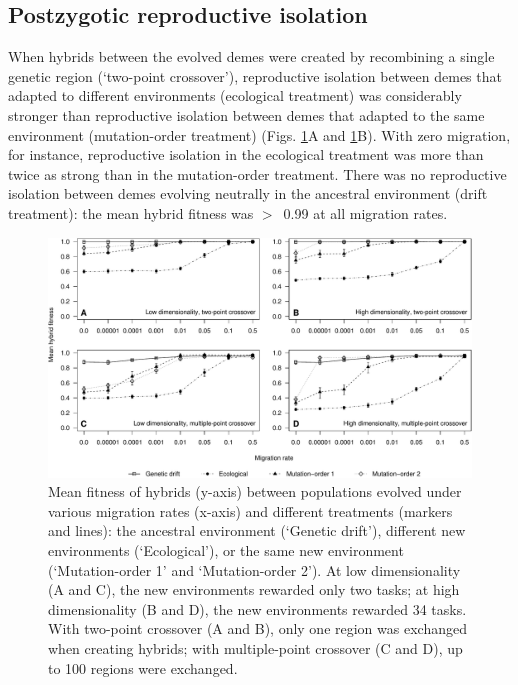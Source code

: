 \begin{doublespace}
\subsection{Postzygotic reproductive isolation}

When hybrids between the evolved demes
were created by recombining a single genetic region (`two-point crossover'),
reproductive isolation between demes
that adapted to different environments (ecological treatment)
was considerably stronger than
reproductive isolation between demes
that adapted to the same environment (mutation-order treatment)
(Figs. \ref{hybrid_fitness}A and \ref{hybrid_fitness}B).
%
With zero migration, for instance,
reproductive isolation in the ecological treatment
was more than twice as strong than in the mutation-order treatment.
%
There was no reproductive isolation between demes
evolving neutrally in the ancestral environment (drift treatment):
the mean hybrid fitness was $>$~0.99 at all migration rates.


\begin{landscape}
\begin{figure}
\thispagestyle{empty}
\centering
\includegraphics[width=\linewidth]{hybrid_fitness.pdf}
\caption{Mean fitness of hybrids (y-axis)
  between populations evolved under various migration rates (x-axis)
  and different treatments (markers and lines):
  the ancestral environment (`Genetic drift'),
  different new environments (`Ecological'),
  or the same new environment (`Mutation-order 1' and `Mutation-order 2').
  At low dimensionality (A and C),
  the new environments rewarded only two tasks;
  at high dimensionality (B and D),
  the new environments rewarded 34 tasks.
  With two-point crossover (A and B),
  only one region was exchanged when creating hybrids;
  with multiple-point crossover (C and D),
  up to 100 regions were exchanged.}
\label{hybrid_fitness}
\end{figure}
\end{landscape}




\end{doublespace}
